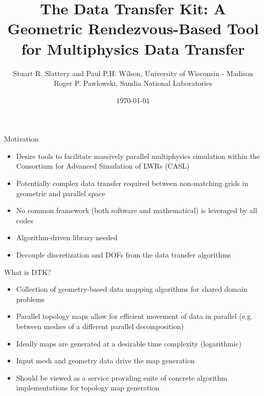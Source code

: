 \documentclass{beamer}
\author{\small Stuart R. Slattery and Paul P.H. Wilson, University of
  Wisconsin - Madison \bigskip \\ Roger P. Pawlowski, Sandia National
  Laboratories }
\date{\today}
\title{The Data Transfer Kit: A Geometric Rendezvous-Based Tool for
  Multiphysics Data Transfer}
\begin{document}
\maketitle

\begin{frame}{Motivation}

  \begin{itemize}
  \item Desire tools to facilitate massively parallel multiphysics
    simulation within the Consortium for Advanced Simulation of LWRs
    (CASL)
    \bigskip
  \item Potentially complex data transfer required between
    non-matching grids in geometric and parallel space
    \bigskip
  \item No common framework (both software and mathematical) is
    leveraged by all codes
    \bigskip
  \item Algorithm-driven library needed
    \bigskip
  \item Decouple discretization and DOFs from the data transfer
    algorithms
  \end{itemize}

\end{frame}

\begin{frame}{What is DTK?}

  \begin{itemize}
  \item Collection of geometry-based data mapping algorithms for
    shared domain problems
    \bigskip
  \item Parallel topology maps allow for efficient movement of data in
    parallel (e.g. between meshes of a different parallel
    decomposition)
    \bigskip
  \item Ideally maps are generated at a desirable time complexity
    (logarithmic)
    \bigskip
  \item Input mesh and geometry data drive the map generation
    \bigskip
  \item Should be viewed as a service providing suite of concrete
    algorithm implementations for topology map generation
  \end{itemize}
 
\end{frame}
\end{document}
